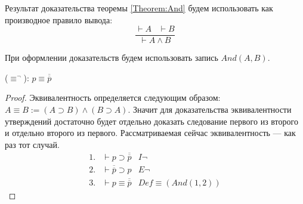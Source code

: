 \begin{remark}
    Результат доказательства теоремы \ref{Theorem:And} будем использовать как производное правило вывода:
    \begin{equation*}
        \frac{
            \vdash A \;\;\; \vdash B
        }{
            \vdash A \land B
        }
        \tag{And}
    \end{equation*}

    При оформлении доказательств будем использовать запись $And(A,B)$.
\end{remark}

\begin{propthm}\label{Theorem:equivlnot}
    ($\equiv^{\lnot}$): $p \equiv \overline{\overline{p}}$
\end{propthm}
\begin{proof}
    Эквивалентность определяется следующим образом: $A \equiv B := (A\supset B) \land (B\supset A)$. Значит для доказательства эквивалентности утверждений достаточно будет отдельно доказать следование первого из второго и отдельно второго из первого. Рассматриваемая сейчас эквивалентность --- как раз тот случай.
    \begin{equation*}
        \begin{array}{llr}
            1. & \vdash p \supset \overline{\overline{p}} & I\lnot \\
            2. & \vdash \overline{\overline{p}} \supset p & E\lnot \\
            3. & \vdash p \equiv \overline{\overline{p}} & Def\equiv(And(1,2))
        \end{array}
    \end{equation*}
\end{proof}